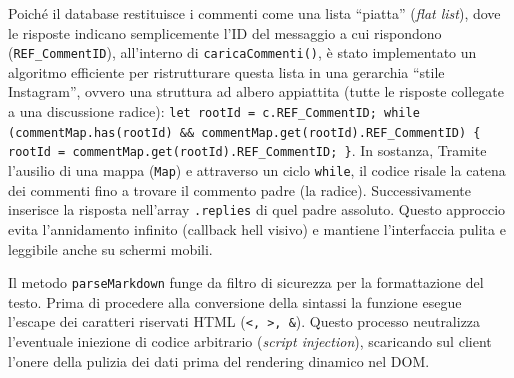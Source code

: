 \documentclass[11pt,a4paper]{article}
\begin{document}
\begin{itemize}
    Poiché il database restituisce i commenti come una lista ``piatta'' (\textit{flat list}), dove le risposte indicano semplicemente l'ID del messaggio a cui rispondono (\texttt{REF\_CommentID}), all'interno di \texttt{caricaCommenti()}, è stato implementato un algoritmo efficiente per ristrutturare questa lista in una gerarchia ``stile Instagram'', ovvero una struttura ad albero appiattita (tutte le risposte collegate a una discussione radice): \texttt{let rootId = c.REF\_CommentID; while (commentMap.has(rootId) \&\& commentMap.get(rootId).REF\_CommentID) \{ rootId = commentMap.get(rootId).REF\_CommentID; \}}. In sostanza, Tramite l'ausilio di una mappa (\texttt{Map}) e attraverso un ciclo \texttt{while}, il codice risale la catena dei commenti fino a trovare il commento padre (la radice). Successivamente inserisce la risposta nell'array \texttt{.replies} di quel padre assoluto. Questo approccio evita l'annidamento infinito (callback hell visivo) e mantiene l'interfaccia pulita e leggibile anche su schermi mobili.
    
    Il metodo \texttt{parseMarkdown} funge da filtro di sicurezza per la formattazione del testo. Prima di procedere alla conversione della sintassi la funzione esegue l'escape dei caratteri riservati HTML (\texttt{<, >, \&}). Questo processo neutralizza l'eventuale iniezione di codice arbitrario (\textit{script injection}), scaricando sul client l'onere della pulizia dei dati prima del rendering dinamico nel DOM.
    

\end{itemize}
\end{document}
